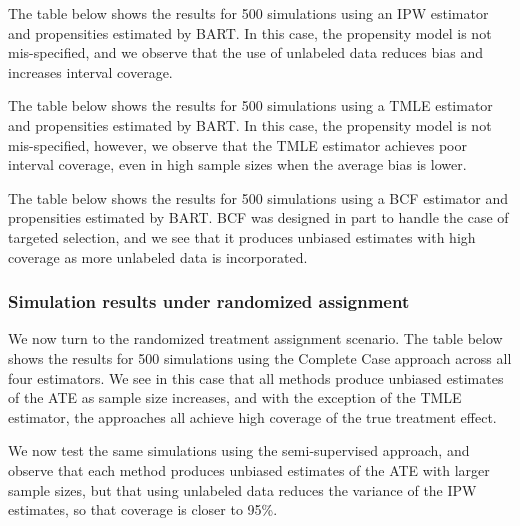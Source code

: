 \documentclass[aos]{imsart}
\begin{document}


The table below shows the results for 500 simulations using an IPW estimator and propensities 
estimated by BART. In this case, the propensity model is not mis-specified, and we observe that 
the use of unlabeled data reduces bias and increases interval coverage.
\newpage



The table below shows the results for 500 simulations using a TMLE estimator and propensities 
estimated by BART. In this case, the propensity model is not mis-specified, however, we observe 
that the TMLE estimator achieves poor interval coverage, even in high sample sizes when the 
average bias is lower.



The table below shows the results for 500 simulations using a BCF estimator and propensities 
estimated by BART. BCF was designed in part to handle the case of targeted selection, and we 
see that it produces unbiased estimates with high coverage as more unlabeled data is incorporated.



\subsubsection{Simulation results under randomized assignment}

We now turn to the randomized treatment assignment scenario. 
The table below shows the results for 500 simulations using the Complete Case approach 
across all four estimators. We see in this case that all methods produce unbiased estimates 
of the ATE as sample size increases, and with the exception of the TMLE estimator, the approaches 
all achieve high coverage of the true treatment effect.



We now test the same simulations using the semi-supervised approach, and observe that 
each method produces unbiased estimates of the ATE with larger sample sizes, but that using 
unlabeled data reduces the variance of the IPW estimates, so that coverage is closer to 95\%.


\end{document}
